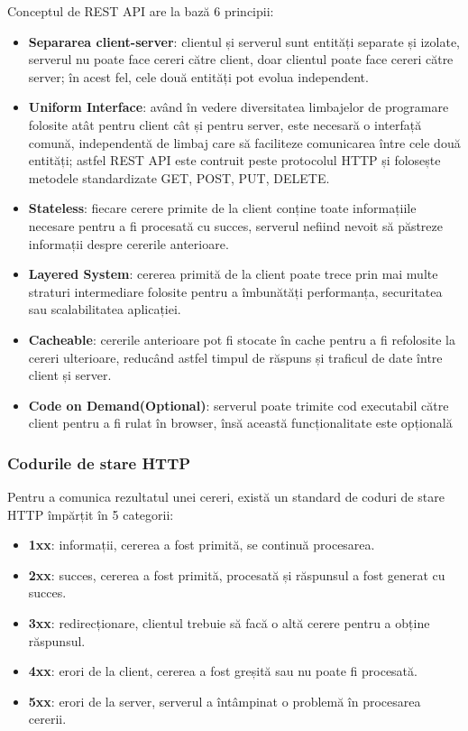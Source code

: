 \par
Conceptul de REST API are la bază 6 principii:
\begin{itemize}
    \item \textbf{Separarea client-server}: clientul și serverul sunt entități separate și izolate,
    serverul nu poate face cereri către client, doar clientul poate face cereri către server; 
    în acest fel, cele două entități pot evolua independent.
    \item \textbf{Uniform Interface}: având în vedere diversitatea limbajelor de programare folosite
    atât pentru client cât și pentru server, este necesară o interfață comună, independentă de limbaj
    care să faciliteze comunicarea între cele două entități; astfel REST API este contruit peste 
    protocolul HTTP și folosește metodele standardizate GET, POST, PUT, DELETE.
    \item \textbf{Stateless}: fiecare cerere primite de la client conține toate informațiile necesare
    pentru a fi procesată cu succes, serverul nefiind nevoit să păstreze informații despre cererile
    anterioare.
    \item \textbf{Layered System}: cererea primită de la client poate trece prin mai multe straturi
    intermediare folosite pentru a îmbunătăți performanța, securitatea sau scalabilitatea aplicației.
    \item \textbf{Cacheable}: cererile anterioare pot fi stocate în cache pentru a fi refolosite
    la cereri ulterioare, reducând astfel timpul de răspuns și traficul de date între client și server.
    \item \textbf{Code on Demand(Optional)}: serverul poate trimite cod executabil către client pentru
    a fi rulat în browser, însă această funcționalitate este opțională
\end{itemize}

\subsubsection{Codurile de stare HTTP}
Pentru a comunica rezultatul unei cereri, există un standard de coduri de stare HTTP împărțit în
5 categorii:
\begin{itemize}
    \item \textbf{1xx}: informații, cererea a fost primită, se continuă procesarea.
    \item \textbf{2xx}: succes, cererea a fost primită, procesată și răspunsul a fost generat cu succes.
    \item \textbf{3xx}: redirecționare, clientul trebuie să facă o altă cerere pentru a obține răspunsul.
    \item \textbf{4xx}: erori de la client, cererea a fost greșită sau nu poate fi procesată.
    \item \textbf{5xx}: erori de la server, serverul a întâmpinat o problemă în procesarea cererii.
\end{itemize}

